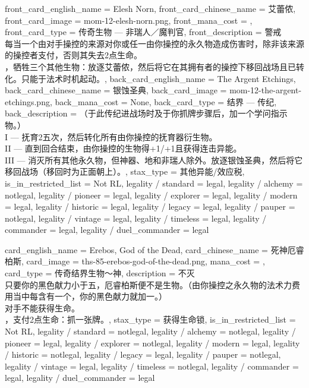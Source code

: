 \documentclass[lang = cn, color = black, 10pt]{AllThatStax}
\begin{document}
\mfcard
{
	front_card_english_name = {Elesh Norn},
	front_card_chinese_name = {艾蕾侬},
	front_card_image = mom-12-elesh-norn.png,
	front_mana_cost = ,
	front_card_type = 传奇生物 — 非瑞人／魔判官,
	front_description = {警戒\\
		每当一个由对手操控的来源对你或任一由你操控的永久物造成伤害时，除非该来源的操控者支付，否则其失去2点生命。\\
		，牺牲三个其他生物：放逐艾蕾侬，然后将它在其拥有者的操控下移回战场且已转化。只能于法术时机起动。},
	back_card_english_name = {The Argent Etchings},
	back_card_chinese_name = {银蚀圣典},
	back_card_image = mom-12-the-argent-etchings.png,
	back_mana_cost = None,
	back_card_type = 结界 — 传纪,
	back_description = {（于此传纪进战场时及于你抓牌步骤后，加一个学问指示物。）\\
		I — 抚育2五次，然后转化所有由你操控的抚育器衍生物。\\
		II — 直到回合结束，由你操控的生物得+1/+1且获得连击异能。\\
		III — 消灭所有其他永久物，但神器、地和非瑞人除外。放逐银蚀圣典，然后将它移回战场（移回时为正面朝上）。},
	stax_type = 其他异能/效应税,
	is_in_restricted_list = Not RL,
	legality / standard = legal,
	legality / alchemy = notlegal,
	legality / pioneer = legal,
	legality / explorer = legal,
	legality / modern = legal,
	legality / historic = legal,
	legality / legacy = legal,
	legality / pauper = notlegal,
	legality / vintage = legal,
	legality / timeless = legal,
	legality / commander = legal,
	legality / duel_commander = legal
}

\card
{
	card_english_name = {Erebos, God of the Dead},
	card_chinese_name = {死神厄睿柏斯},
	card_image = ths-85-erebos-god-of-the-dead.png,
	mana_cost = ,
	card_type = 传奇结界生物～神,
	description = {不灭\\
		只要你的黑色献力小于五，厄睿柏斯便不是生物。（由你操控之永久物的法术力费用当中每含有一个，你的黑色献力就加一。）\\
		对手不能获得生命。\\
		，支付2点生命：抓一张牌。},
	stax_type = 获得生命锁,
	is_in_restricted_list = Not RL,
	legality / standard = notlegal,
	legality / alchemy = notlegal,
	legality / pioneer = legal,
	legality / explorer = notlegal,
	legality / modern = legal,
	legality / historic = notlegal,
	legality / legacy = legal,
	legality / pauper = notlegal,
	legality / vintage = legal,
	legality / timeless = notlegal,
	legality / commander = legal,
	legality / duel_commander = legal
}
\end{document}
